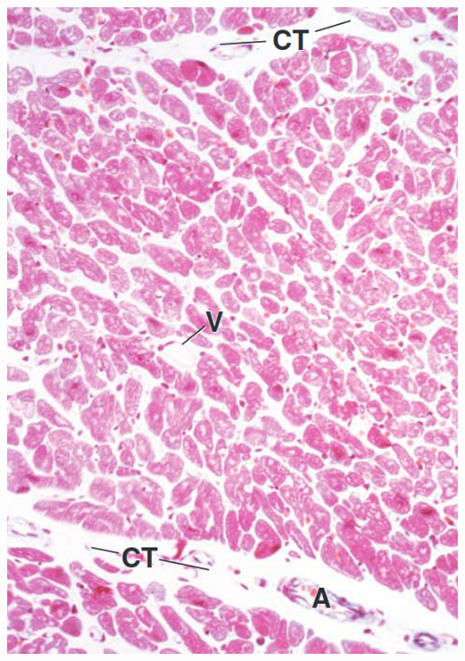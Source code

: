 \begin{itemize}
\begin{center}
    \includegraphics[scale=0.18]{images/week-1-rp9.png}

\end{center}
\end{itemize}
